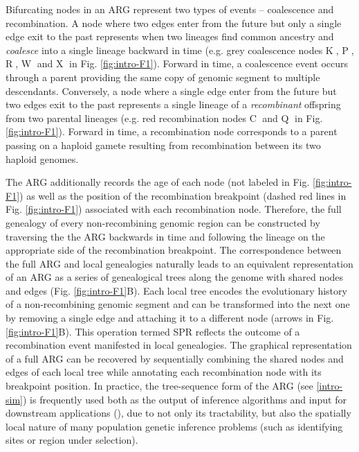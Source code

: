 Bifurcating nodes in an \ac{ARG} represent two types of events -- coalescence and recombination. A node where two edges enter from the future but only a single edge exit to the past represents when two lineages find common ancestry and \textit{coalesce} into a single lineage backward in time (e.g. grey coalescence nodes \textcircled{K}, \textcircled{P}, \textcircled{R}, \textcircled{W} and \textcircled{X} in Fig. \ref{fig:intro-F1}). Forward in time, a coalescence event occurs through a parent providing the same copy of genomic segment to multiple descendants. Conversely, a node where a single edge enter from the future but two edges exit to the past represents a single lineage of a \textit{recombinant} offspring from two parental lineages (e.g. red recombination nodes \textcircled{C} and \textcircled{Q} in Fig. \ref{fig:intro-F1}). Forward in time, a recombination node corresponds to a parent passing on a haploid gamete resulting from recombination between its two haploid genomes.

The \ac{ARG} additionally records the age of each node (not labeled in Fig. \ref{fig:intro-F1}) as well as the position of the recombination breakpoint (dashed red lines in Fig. \ref{fig:intro-F1}) associated with each recombination node. Therefore, the full genealogy of every non-recombining genomic region can be constructed by traversing the the \ac{ARG} backwards in time and following the lineage on the appropriate side of the recombination breakpoint. The correspondence between the full \ac{ARG} and local genealogies naturally leads to an equivalent representation of an \ac{ARG} as a series of genealogical trees along the genome with shared nodes and edges (Fig. \ref{fig:intro-F1}B). Each local tree encodes the evolutionary history of a non-recombining genomic segment and can be transformed into the next one by removing a single edge and attaching it to a different node (arrows in Fig. \ref{fig:intro-F1}B). This operation termed \acf{SPR} reflects the outcome of a recombination event manifested in local genealogies. The graphical representation of a full \ac{ARG} can be recovered by sequentially combining the shared nodes and edges of each local tree while annotating each recombination node with its breakpoint position. In practice, the tree-sequence form of the \ac{ARG} (see \ref{intro-sim}) is frequently used both as the output of inference algorithms and input for downstream applications (\cite{lewanski2023era}), due to not only its tractability, but also the spatially local nature of many population genetic inference problems (such as identifying sites or region under selection).


